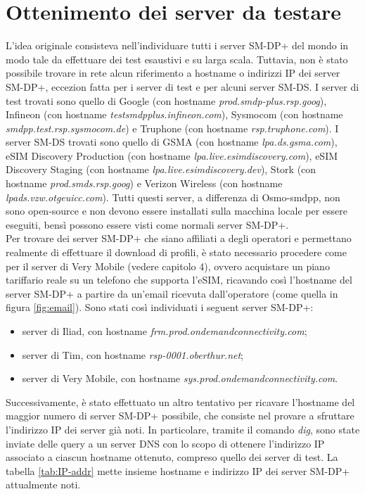 \documentclass[10pt, oneside]{book}
\begin{document}
\section{Ottenimento dei server da testare}
L'idea originale consisteva nell'individuare tutti i server SM-DP+ del mondo in modo tale da effettuare dei test esaustivi e su larga scala. Tuttavia, non è stato possibile trovare in rete alcun riferimento a hostname o indirizzi IP dei server SM-DP+, eccezion fatta per i server di test e per alcuni server SM-DS. I server di test trovati sono quello di Google (con hostname \textit{prod.smdp-plus.rsp.goog}), Infineon (con hostname \textit{testsmdpplus.infineon.com}), Sysmocom (con hostname\\ \textit{smdpp.test.rsp.sysmocom.de}) e Truphone (con hostname \textit{rsp.truphone.com}). I server SM-DS trovati sono quello di GSMA (con hostname \textit{lpa.ds.gsma.com}), eSIM Discovery Production (con hostname \textit{lpa.live.esimdiscovery.com}), eSIM Discovery Staging (con hostname \textit{lpa.live.esimdiscovery.dev}), Stork (con hostname \textit{prod.smds.rsp.goog}) e Verizon Wireless (con hostname \textit{lpads.vzw.otgeuicc.com}). Tutti questi server, a differenza di Osmo-smdpp, non sono open-source e non devono essere installati sulla macchina locale per essere eseguiti, bensì possono essere visti come normali server SM-DP+.\\
Per trovare dei server SM-DP+ che siano affiliati a degli operatori e permettano realmente di effettuare il download di profili, è stato necessario procedere come per il server di Very Mobile (vedere capitolo 4), ovvero acquistare un piano tariffario reale su un telefono che supporta l'eSIM, ricavando così l'hostname del server SM-DP+ a partire da un'email ricevuta dall'operatore (come quella in figura \ref{fig:email}). Sono stati così individuati i seguent server SM-DP+:
\begin{itemize}
\item server di Iliad, con hostname \textit{frm.prod.ondemandconnectivity.com};
\item server di Tim, con hostname \textit{rsp-0001.oberthur.net};
\item server di Very Mobile, con hostname \textit{sys.prod.ondemandconnectivity.com}.
\end{itemize}
Successivamente, è stato effettuato un altro tentativo per ricavare l'hostname del maggior numero di server SM-DP+ possibile, che consiste nel provare a sfruttare l'indirizzo IP dei server già noti. In particolare, tramite il comando \textit{dig}, sono state inviate delle query a un server DNS con lo scopo di ottenere l'indirizzo IP associato a ciascun hostname ottenuto, compreso quello dei server di test. La tabella \ref{tab:IP-addr} mette insieme hostname e indirizzo IP dei server SM-DP+ attualmente noti.
\end{document}
